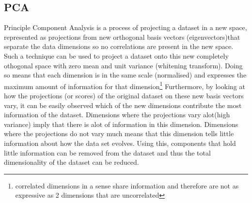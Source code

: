 \documentclass[twocolumn]{article}
\begin{document}
\subsection{PCA}
Principle Component Analysis is a process of projecting a dataset in a new space, represented as projections
from new orthogonal basis vectors (eigenvectors)that separate the data dimensions so no correlations are present in the new
space. Such a technique can be used to project a dataset onto this new completely 
othogonal space with zero mean and unit variance (whitening transform\cite{whitening}). Doing so means that each dimension
is in the same scale (normalised) and expresses the maximum amount of information for that dimension\footnote{correlated dimensions
in a sense share information and therefore are not as expressive as 2 dimensions that are uncorrelated}
Furthermore, by looking at how the projections (or scores) of the original dataset on these new basis vectors vary, it can be
easily observed which of the new dimensions contribute the most information of the dataset. Dimensions where the projections
vary alot(high variance) imply that there is alot of information in this dimension. Dimensions where the projections do not
vary much means that this dimension tells little information about how the data set evolves. Using this, components that
hold little information can be removed from the dataset and thus the total dimensionality of the dataset can be reduced. 
\end{document}
